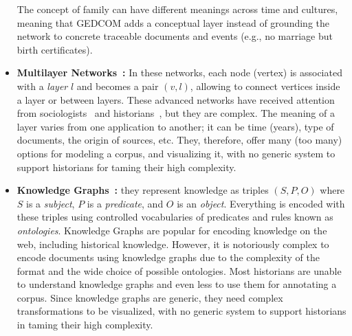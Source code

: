 \begin{itemize}[nosep,leftmargin=*]
    The concept of family can have different meanings across time and cultures, meaning that GEDCOM adds a conceptual layer instead of grounding the network to concrete traceable documents and events (e.g., no marriage but birth certificates).
    \item \textbf{Multilayer Networks~\cite{multilayer}: } In these networks, each node (vertex) is associated with a \emph{layer} $l$ and becomes a pair $(v, l)$, allowing to connect vertices inside a layer or between layers. These advanced networks have received attention from sociologists~\cite{CRNOVRSANIN201456} and historians~\cite{vanVugt_2017}, but they are complex. The meaning of a layer varies from one application to another; it can be time (years), type of documents, the origin of sources, etc. They, therefore, offer many (too many) options for modeling a corpus, and visualizing it, with no generic system to support historians for taming their high complexity.
    \item \textbf{Knowledge Graphs~\cite{hoganKnowledgeGraphs2021}: } they represent knowledge as triples $(S, P, O)$ where $S$ is a \emph{subject}, $P$ is a \emph{predicate}, and $O$ is an \emph{object}. Everything is encoded with these triples using controlled vocabularies of predicates and rules known as \emph{ontologies}. Knowledge Graphs are popular for encoding knowledge on the web, including historical knowledge. However, it is notoriously complex to encode documents using knowledge graphs due to the complexity of the format and the wide choice of possible ontologies. Most historians are unable to understand knowledge graphs and even less to use them for annotating a corpus. Since knowledge graphs are generic, they need complex transformations to be visualized, with no generic system to support historians in taming their high complexity.
\end{itemize}


